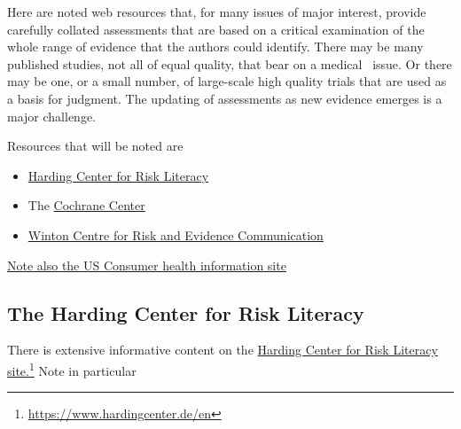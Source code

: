 \documentclass[
  10pt,
  b5paper]{book}
\providecommand{\tightlist}{%
  \setlength{\itemsep}{0pt}\setlength{\parskip}{0pt}}
\begin{document}
Here are noted web resources that, for many issues of major
interest, provide carefully collated assessments that are
based on a critical examination of the whole range of evidence
that the authors could identify. There may be many
published studies, not all of equal quality, that bear on a medical~
issue. Or there may be one, or a small number, of large-scale high
quality trials that are used as a basis for judgment. The updating
of assessments as new evidence emerges is a major challenge.

Resources that will be noted are

\begin{itemize}
\tightlist
\item
  \href{https://www.hardingcenter.de/en}{Harding Center for Risk Literacy}
\item
  The \href{https://www.cochrane.org/}{Cochrane Center}
\item
  \href{https://wintoncentre.maths.cam.ac.uk/}{Winton Centre for Risk and Evidence Communication}
\end{itemize}

\href{https://medlineplus.gov/}{Note also the US Consumer health information site}

\hypertarget{the-harding-center-for-risk-literacy}{%
\subsection*{The Harding Center for Risk Literacy}\label{the-harding-center-for-risk-literacy}}

There is extensive informative content on the \href{https://www.hardingcenter.de/en}{Harding Center for Risk Literacy site.}\footnote{\url{https://www.hardingcenter.de/en}} Note in particular
\end{document}
